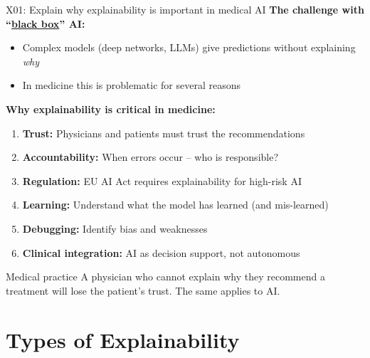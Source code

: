 \documentclass[aspectratio=169, 10pt]{beamer}
\begin{document}
\begin{frame}{X01: Explain why explainability is important in medical AI}
    \textbf{The challenge with ``\href{https://en.wikipedia.org/wiki/Black_box}{black box}'' AI:}
    \begin{itemize}
        \item Complex models (deep networks, LLMs) give predictions without explaining \textit{why}
        \item In medicine this is problematic for several reasons
    \end{itemize}
    
    \vspace{0.2cm}
    \textbf{Why explainability is critical in medicine:}
    \begin{enumerate}
        \item \textbf{Trust:} Physicians and patients must trust the recommendations
        \item \textbf{Accountability:} When errors occur -- who is responsible?
        \item \textbf{Regulation:} EU AI Act requires explainability for high-risk AI
        \item \textbf{Learning:} Understand what the model has learned (and mis-learned)
        \item \textbf{Debugging:} Identify bias and weaknesses
        \item \textbf{Clinical integration:} AI as decision support, not autonomous
    \end{enumerate}
    
    {\footnotesize
    \begin{alertblock}{Medical practice}
        A physician who cannot explain why they recommend a treatment will lose the patient's trust. The same applies to AI.
    \end{alertblock}
    }
\end{frame}

\section{Types of Explainability}
\end{document}
